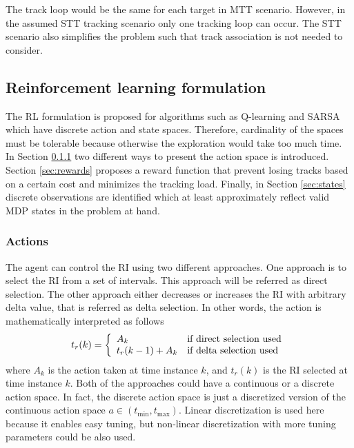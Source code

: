 \documentclass[english, 12pt, a4paper, elec, utf8, a-1b, online]{aaltothesis}
\newcommand{\tmax}{t_\text{max}}
\newcommand{\tmin}{t_\text{min}}
\begin{document}
The track loop would be the same for each target in MTT scenario. However, in the assumed STT tracking scenario only one tracking loop can occur. The STT scenario also simplifies the problem such that track association is not needed to consider.




\subsection{Reinforcement learning formulation}\label{sec:RL_formulation}

The RL formulation is proposed for algorithms such as Q-learning and SARSA which have discrete action and state spaces. 
Therefore, cardinality of the spaces must be tolerable because otherwise the exploration would take too much time.
In Section \ref{sec:actions} two different ways to present the action space is introduced.
Section \ref{sec:rewards} proposes a reward function that prevent losing tracks based on a certain cost and minimizes the tracking load. 
Finally, in Section \ref{sec:states} discrete observations are identified which at least approximately reflect valid MDP states in the problem at hand.

\subsubsection{Actions} \label{sec:actions}

The agent can control the RI using two different approaches.
One approach is to select the RI from a set of intervals.
This approach will be referred as direct selection.
The other approach either decreases or increases the RI with arbitrary delta value, that is referred as delta selection.
In other words, the action is mathematically interpreted as follows
\begin{equation}
    t_r(k) = \left\{
        \begin{array}{l l}
            A_k & \text{if direct selection used} \\
            t_r(k-1) + A_k &  \text{if delta selection used}
        \end{array}\right.
\end{equation}
where $A_k$ is the action taken at time instance $k$, and $t_r(k)$ is the RI selected at time instance $k$.
Both of the approaches could have a continuous or a discrete action space.
In fact, the discrete action space is just a discretized version of the continuous action space $a \in (\tmin, \tmax)$.
Linear discretization is used here because it enables easy tuning, but non-linear discretization with more tuning parameters could be also used.
\end{document}
